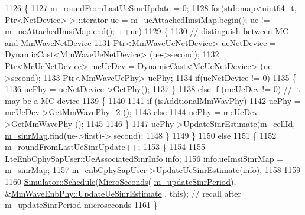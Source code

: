 \begin{DoxyCode}
1126         \{
1127                 \hyperlink{classns3_1_1MmWaveEnbPhy_a708a523883e45c2b4d369b4367327fd8}{m\_roundFromLastUeSinrUpdate} = 0;
1128                 \textcolor{keywordflow}{for}(std::map<uint64\_t, Ptr<NetDevice> >::iterator ue = 
      \hyperlink{classns3_1_1MmWaveEnbPhy_a1e8b3730ff37d9fc19d9ec07f06e6be5}{m\_ueAttachedImsiMap}.begin(); ue != \hyperlink{classns3_1_1MmWaveEnbPhy_a1e8b3730ff37d9fc19d9ec07f06e6be5}{m\_ueAttachedImsiMap}.end(); ++ue)
1129                 \{
1130                         \textcolor{comment}{// distinguish between MC and MmWaveNetDevice}
1131                         Ptr<MmWaveUeNetDevice> ueNetDevice = DynamicCast<MmWaveUeNetDevice> (ue->second);
1132                         Ptr<McUeNetDevice> mcUeDev = DynamicCast<McUeNetDevice> (ue->second);
1133                         Ptr<MmWaveUePhy> uePhy;
1134                         \textcolor{keywordflow}{if}(ueNetDevice != 0) 
1135                         \{
1136                                 uePhy = ueNetDevice->GetPhy();
1137                         \}
1138                         \textcolor{keywordflow}{else} \textcolor{keywordflow}{if} (mcUeDev != 0) \textcolor{comment}{// it may be a MC device}
1139                         \{
1140 
1141                                 \textcolor{keywordflow}{if} (\hyperlink{classns3_1_1MmWaveEnbPhy_a1a171ed81b1efedf963000d89f2cbd98}{isAddtionalMmWavPhy})
1142                                         uePhy = mcUeDev->GetMmWavePhy\_2 ();
1143                                 \textcolor{keywordflow}{else}
1144                                         uePhy = mcUeDev->GetMmWavePhy ();
1145 
1146                         \}
1147                         uePhy->UpdateSinrEstimate(\hyperlink{classns3_1_1MmWavePhy_a0594531da45f93220d4f5de292bae823}{m\_cellId}, \hyperlink{classns3_1_1MmWaveEnbPhy_a754de7cf4bdbe107dfb006a5b332842a}{m\_sinrMap}.find(ue->first)->
      second);
1148                 \}
1149         \}
1150         \textcolor{keywordflow}{else}
1151         \{
1152                 \hyperlink{classns3_1_1MmWaveEnbPhy_a708a523883e45c2b4d369b4367327fd8}{m\_roundFromLastUeSinrUpdate}++;
1153         \}
1154 
1155         LteEnbCphySapUser::UeAssociatedSinrInfo info;
1156         info.ueImsiSinrMap = \hyperlink{classns3_1_1MmWaveEnbPhy_a754de7cf4bdbe107dfb006a5b332842a}{m\_sinrMap};
1157         \hyperlink{classns3_1_1MmWaveEnbPhy_ac5d84411029763cff0e7a1437c3a9397}{m\_enbCphySapUser}->\hyperlink{classns3_1_1LteEnbCphySapUser_aed0dcd8c1add1b9e51138420ed6d2b1a}{UpdateUeSinrEstimate}(info);
1158         
1159 
1160         \hyperlink{classns3_1_1Simulator_a671882c894a08af4a5e91181bf1eec13}{Simulator::Schedule}(\hyperlink{group__timecivil_ga17465a639c8d1464e76538afdd78a9f0}{MicroSeconds}(
      \hyperlink{classns3_1_1MmWaveEnbPhy_af5b7224db4adb4c546e71ec42ce82703}{m\_updateSinrPeriod}), &\hyperlink{classns3_1_1MmWaveEnbPhy_a09aa03118ceed8c46f87dc0f6b6c71a2}{MmWaveEnbPhy::UpdateUeSinrEstimate}
      , \textcolor{keyword}{this}); \textcolor{comment}{// recall after m\_updateSinrPeriod microseconds}
1161 \}
\end{DoxyCode}


